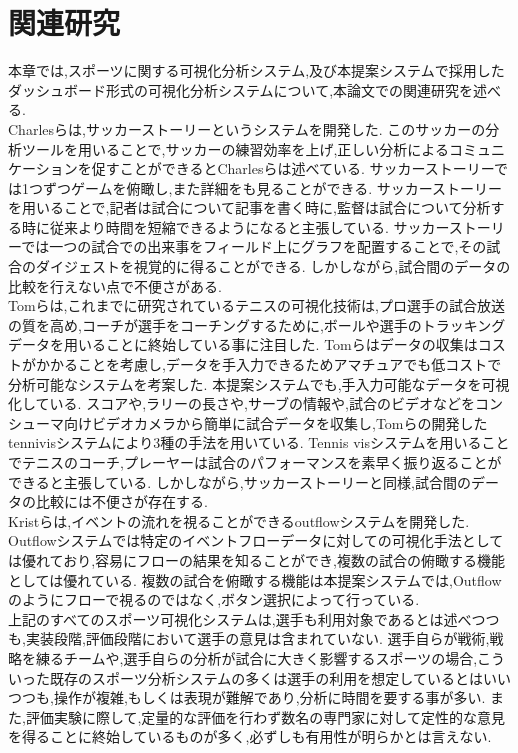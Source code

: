 \documentclass[sotsuron]{kuee}
\begin{document}
\chapter{関連研究}
	本章では,スポーツに関する可視化分析システム,及び本提案システムで採用したダッシュボード形式の可視化分析システムについて,本論文での関連研究を述べる.
	\\Charlesらは,サッカーストーリーというシステムを開発した.
	このサッカーの分析ツールを用いることで,サッカーの練習効率を上げ,正しい分析によるコミュニケーションを促すことができるとCharlesらは述べている.
	サッカーストーリーでは1つずつゲームを俯瞰し,また詳細をも見ることができる.
	サッカーストーリーを用いることで,記者は試合について記事を書く時に,監督は試合について分析する時に従来より時間を短縮できるようになると主張している.
	サッカーストーリーでは一つの試合での出来事をフィールド上にグラフを配置することで,その試合のダイジェストを視覚的に得ることができる.
	しかしながら,試合間のデータの比較を行えない点で不便さがある.
	\\Tomらは,これまでに研究されているテニスの可視化技術は,プロ選手の試合放送の質を高め,コーチが選手をコーチングするために,ボールや選手のトラッキングデータを用いることに終始している事に注目した.
	Tomらはデータの収集はコストがかかることを考慮し,データを手入力できるためアマチュアでも低コストで分析可能なシステムを考案した.
	本提案システムでも,手入力可能なデータを可視化している.
	スコアや,ラリーの長さや,サーブの情報や,試合のビデオなどをコンシューマ向けビデオカメラから簡単に試合データを収集し,Tomらの開発したtennivisシステムにより3種の手法を用いている.
	Tennis visシステムを用いることでテニスのコーチ,プレーヤーは試合のパフォーマンスを素早く振り返ることができると主張している.
	しかしながら,サッカーストーリーと同様,試合間のデータの比較には不便さが存在する.
	\\Kristらは,イベントの流れを視ることができるoutflowシステムを開発した.
	Outflowシステムでは特定のイベントフローデータに対しての可視化手法としては優れており,容易にフローの結果を知ることができ,複数の試合の俯瞰する機能としては優れている.
	複数の試合を俯瞰する機能は本提案システムでは,Outflowのようにフローで視るのではなく,ボタン選択によって行っている.	
	\\上記のすべてのスポーツ可視化システムは,選手も利用対象であるとは述べつつも,実装段階,評価段階において選手の意見は含まれていない.
	選手自らが戦術,戦略を練るチームや,選手自らの分析が試合に大きく影響するスポーツの場合,こういった既存のスポーツ分析システムの多くは選手の利用を想定しているとはいいつつも,操作が複雑,もしくは表現が難解であり,分析に時間を要する事が多い.
	また,評価実験に際して,定量的な評価を行わず数名の専門家に対して定性的な意見を得ることに終始しているものが多く,必ずしも有用性が明らかとは言えない.
\end{document}
